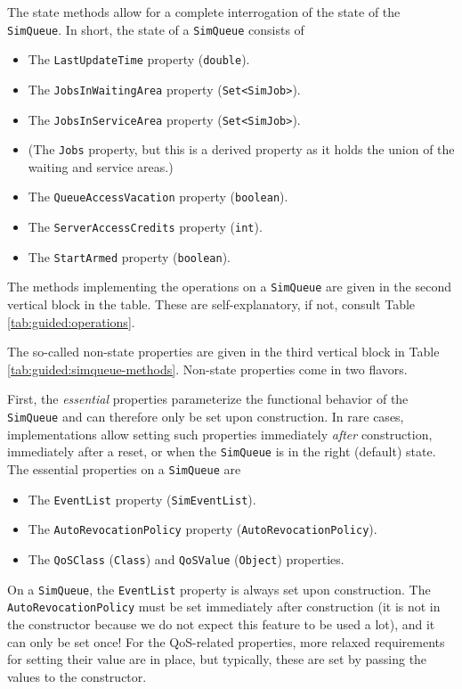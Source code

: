 The state methods allow for a complete interrogation of the state
of the \lstinline|SimQueue|.
In short, the state of a \lstinline|SimQueue| consists of
\begin{itemize}
	\item The \lstinline|LastUpdateTime| property (\lstinline|double|).
	\item The \lstinline|JobsInWaitingArea| property (\lstinline|Set<SimJob>|).
	\item The \lstinline|JobsInServiceArea| property (\lstinline|Set<SimJob>|).
	\item (The \lstinline|Jobs| property, but this is a derived
	property as it holds the union of the waiting and service areas.)
	\item The \lstinline|QueueAccessVacation| property (\lstinline|boolean|).
	\item The \lstinline|ServerAccessCredits| property (\lstinline|int|).
	\item The \lstinline|StartArmed| property (\lstinline|boolean|).
\end{itemize}

The methods implementing the operations on a \lstinline|SimQueue|
are given in the second vertical block in the table.
These are self-explanatory, if not,
consult Table \ref{tab:guided:operations}.

The so-called non-state properties are given in the third
vertical block in Table \ref{tab:guided:simqueue-methods}.
Non-state properties come in two flavors.

First, the {\em essential\/} properties parameterize the
functional behavior of the \lstinline|SimQueue|
and can therefore only be set upon construction.
In rare cases, implementations allow setting
such properties immediately {\em after\/}
construction,
immediately after a reset,
or when the \lstinline|SimQueue| is in the right (default) state.
The essential properties on a \lstinline|SimQueue| are
\begin{itemize}
	\item The \lstinline|EventList| property (\lstinline|SimEventList|).
	\item The \lstinline|AutoRevocationPolicy| property (\lstinline|AutoRevocationPolicy|).
	\item The \lstinline|QoSClass| (\lstinline|Class|)
	and \lstinline|QoSValue| (\lstinline|Object|) properties.
\end{itemize}
On a \lstinline|SimQueue|, the \lstinline|EventList| property is always set upon
construction.
The \lstinline|AutoRevocationPolicy| must be set immediately
after construction (it is not in the constructor because we do not
expect this feature to be used a lot),
and it can only be set once!
For the QoS-related properties, more relaxed requirements
for setting their value are in place,
but typically,
these are set by passing the values to the constructor.

